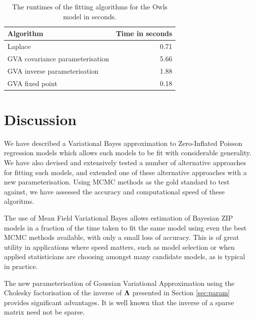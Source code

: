 			\begin{table}
				\begin{tabular}{|l|r|}
				\hline
				Algorithm & Time in seconds \\
				\hline
				Laplace & 0.71 \\
				GVA covariance parameterisation & 5.66 \\
				GVA inverse parameterisation & 1.88 \\
				GVA fixed point & 0.18 \\
				\hline
				\end{tabular}
				\caption{The runtimes of the fitting algorithms for the Owls model in seconds.}
				\label{tab:owls_times}
			\end{table}

			\section{Discussion}
			\label{sec:discussion}
					
			We have described a Variational Bayes approximation to Zero-Inflated Poisson regression models which allows
			such models to be fit with considerable generality. We have also devised and extensively tested a number of
			alternative approaches for fitting such models, and extended one of these alternative approaches with a new
			parameterisation. Using MCMC methods as the gold standard to test against, we have assessed the accuracy and
			computational speed of these algoritms.
					
			The use of Mean Field Variational Bayes allows estimation of Bayesian ZIP models in a fraction of the time taken to fit the same model using even the best MCMC methods available, with only a small loss of accuracy.
			This is of great utility in applications where speed matters, such as model selection or when applied
			statisticians are choosing amongst many candidate models, as is typical in practice.
					
			The new parameterisation of Gaussian Variational Approximation using the Cholesky factorisation of the inverse of ${\boldsymbol \Lambda}$ presented in Section \ref{sec:param} provides significant advantages.  It is well known that the inverse of a sparse matrix need not be sparse. 

